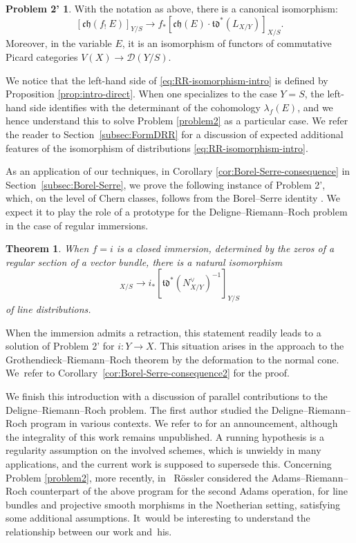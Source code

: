 \documentclass[JEP,XML,SOM,Unicode,published]{cedram}
\theoremstyle{plain}
\newtheorem{thm}{Theorem}
\theoremstyle{definition}
\newtheorem*{problem2prime}{Problem 2'}
\newcommand{\Dcal}{\mathcal D}
\newcommand{\Ocal}{\mathcal O}
\newcommand{\chfrak}{\mathfrak {ch}}
\newcommand{\tdfrak}{\mathfrak {td}}
\begin{document}
\begin{problem2prime}

With the notation as above, there is a canonical isomorphism:
\begin{equation}\label{eq:RR-isomorphism-intro}
[\chfrak(f_!\ E)]_{Y/S}\to f_\ast [\chfrak(E) \cdot \tdfrak^{\ast}(L_{X/Y})]_{X/S}.
\end{equation}
Moreover, in the variable $E$, it is an isomorphism of functors of commutative Picard categories $V(X)\to\Dcal(Y/S)$.
\end{problem2prime}

We notice that the left-hand side of \eqref{eq:RR-isomorphism-intro} is defined by Proposition \ref{prop:intro-direct}. When one specializes to the case $Y=S$, the left-hand side identifies with the determinant of the cohomology $\lambda_{f}(E)$, and we hence understand this to solve Problem \ref{problem2} as a particular case. We refer the reader to Section~\ref{subsec:FormDRR} for a discussion of expected additional features of the isomorphism of distributions \eqref{eq:RR-isomorphism-intro}.

As an application of our techniques, in Corollary \ref{cor:Borel-Serre-consequence} in Section~\ref{subsec:Borel-Serre}, we prove the following instance of Problem 2', which, on the level of Chern classes, follows from the Borel--Serre identity \cite[Lem.\,18]{Borel-Serre}. We expect it to play the role of a prototype for the Deligne--Riemann--Roch problem in the case of regular immersions.

\begin{thm}
When $f=i$ is a closed immersion, determined by the zeros of a regular section of a vector bundle, there is a natural isomorphism
\begin{displaymath}
[\chfrak(i_! \ \Ocal_Y)]_{X/S} \to i_\ast [\tdfrak^{\ast}(N_{X/Y}^\vee)^{-1}]_{Y/S}
\end{displaymath}
of line distributions.
\end{thm}
When the immersion admits a retraction, this statement readily leads to a solution of Problem 2' for $i\colon Y\to X$. This situation arises in the approach to the Grothendieck--Riemann--Roch theorem by the deformation to the normal cone. We~refer to Corollary~\ref{cor:Borel-Serre-consequence2} for the proof.

We finish this introduction with a discussion of parallel contributions to the Deligne--Riemann--Roch problem.
The first author studied the Deligne--Riemann--Roch program in various contexts. We refer to \cite{EriComptes} for an announcement, although the integrality of this work remains unpublished. A running hypothesis is a regularity assumption on the involved schemes, which is unwieldy in many applications, and the current work is supposed to supersede this. Concerning Problem \ref{problem2}, more recently, in~\cite{Rossler-ARR} Rössler considered the Adams--Riemann--Roch counterpart of the above program for the second Adams operation, for line bundles and projective smooth morphisms in the Noetherian setting, satisfying some additional assumptions. It~would be interesting to understand the relationship between our work and~his.
\end{document}
